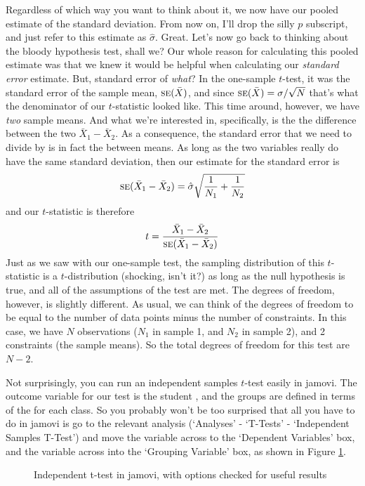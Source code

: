 Regardless of which way you want to think about it, we now have our pooled estimate of the standard deviation. From now on, I'll drop the silly $p$ subscript, and just refer to this estimate as $\hat\sigma$. Great. Let's now go back to thinking about the bloody hypothesis test, shall we? Our whole reason for calculating this pooled estimate was that we knew it would be helpful when calculating our {\it standard error} estimate. But, standard error of {\it what}? In the one-sample $t$-test, it was the standard error of the sample mean, $\mbox{\textsc{se}}(\bar{X})$, and since $\mbox{\textsc{se}}(\bar{X}) = \sigma / \sqrt{N}$ that's what the denominator of our $t$-statistic looked like. This time around, however, we have {\it two} sample means. And what we're interested in, specifically, is the the difference between the two $\bar{X}_1 - \bar{X}_2$. As a consequence, the standard error that we need to divide by is in fact the  between means. As long as the two variables really do have the same standard deviation, then our estimate for the standard error is
$$
\mbox{\textsc{se}}(\bar{X}_1 - \bar{X}_2) = \hat\sigma \sqrt{\frac{1}{N_1} + \frac{1}{N_2}}
$$
and our $t$-statistic is therefore 
$$
t = \frac{\bar{X}_1 - \bar{X}_2}{\mbox{\textsc{se}}(\bar{X}_1 - \bar{X}_2)}
$$
Just as we saw with our one-sample test, the sampling distribution of this $t$-statistic is a $t$-distribution (shocking, isn't it?) as long as the null hypothesis is true, and all of the assumptions of the test are met. The degrees of freedom, however, is slightly different. As usual, we can think of the degrees of freedom to be equal to the number of data points minus the number of constraints. In this case, we have $N$ observations ($N_1$ in sample 1, and $N_2$ in sample 2), and 2 constraints (the sample means). So the total degrees of freedom for this test are $N-2$. 



Not surprisingly, you can run an independent samples $t$-test easily in jamovi. The outcome variable for our test is the student , and the groups are defined in terms of the  for each class. So you probably won't be too surprised that all you have to do in jamovi is go to the relevant analysis (`Analyses' - `T-Tests' - `Independent Samples T-Test') and move the  variable across to the `Dependent Variables' box, and the  variable across into the `Grouping Variable' box, as shown in Figure \ref{fig:ttest_ind}.

\begin{figure}[h]
\begin{center}
\caption{Independent t-test in jamovi, with options checked for useful results}
\HR
\label{fig:ttest_ind}
\end{center}
\end{figure}

